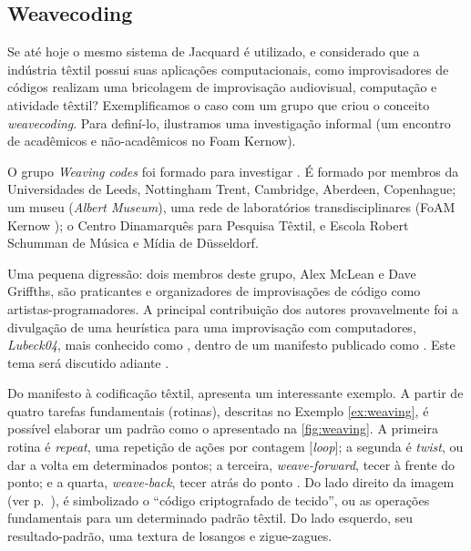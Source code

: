 \subsection{Weavecoding}\label{sec:weavecoding}

Se até hoje o mesmo sistema de Jacquard é utilizado, e considerado que a indústria têxtil possui suas aplicações computacionais, como improvisadores de códigos realizam uma bricolagem de improvisação audiovisual, computação e atividade têxtil? Exemplificamos o caso com um grupo que criou o conceito \emph{weavecoding}. Para definí-lo, ilustramos uma investigação informal (um encontro de acadêmicos e não-acadêmicos no Foam Kernow).

O grupo \emph{Weaving codes} foi formado para  investigar . É formado por membros da Universidades de Leeds, Nottingham Trent, Cambridge, Aberdeen, Copenhague; um museu (\emph{Albert Museum}), uma rede de laboratórios transdisciplinares (FoAM Kernow ); o Centro Dinamarquês para Pesquisa Têxtil, e Escola Robert Schumman de Música e Mídia de  Düsseldorf. 

Uma pequena digressão: dois membros deste grupo, Alex McLean e Dave Griffths, são praticantes e organizadores de improvisações de código como artistas-programadores. A principal contribuição dos autores provavelmente foi a divulgação de uma heurística para uma improvisação com computadores, \emph{Lubeck04}, mais conhecido como , dentro de um manifesto publicado como  \cite{ward_live_2004}. Este tema será discutido adiante .

Do manifesto à codificação têxtil,  apresenta um interessante exemplo. A partir de quatro tarefas fundamentais (rotinas), descritas no Exemplo \autoref{ex:weaving}, é possível elaborar um padrão como o apresentado na \autoref{fig:weaving}. A primeira rotina é \emph{repeat}, uma repetição de ações por contagem $[$\emph{loop}$]$; a segunda é \emph{twist}, ou dar a volta em determinados pontos; a terceira,  \emph{weave-forward}, tecer à frente do ponto; e a quarta, \emph{weave-back}, tecer atrás do ponto . Do lado direito da imagem (ver p.~\pageref{fig:weaving}), é simbolizado o ``código criptografado de tecido'', ou as operações fundamentais para um determinado padrão têxtil. Do lado esquerdo, seu resultado-padrão, uma textura de losangos e zigue-zagues.  

